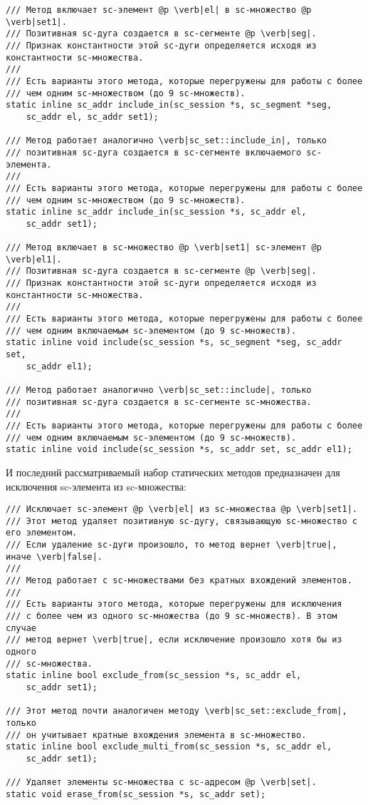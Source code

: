 \begin{lstlisting}[texcl]
/// Метод включает sc-элемент @p \verb|el| в sc-множество @p \verb|set1|.
/// Позитивная sc-дуга создается в sc-сегменте @p \verb|seg|.
/// Признак константности этой sc-дуги определяется исходя из константности sc-множества.
///
/// Есть варианты этого метода, которые перегружены для работы с более
/// чем одним sc-множеством (до 9 sc-множеств).
static inline sc_addr include_in(sc_session *s, sc_segment *seg,
    sc_addr el, sc_addr set1);

/// Метод работает аналогично \verb|sc_set::include_in|, только
/// позитивная sc-дуга создается в sc-сегменте включаемого sc-элемента.
///
/// Есть варианты этого метода, которые перегружены для работы с более
/// чем одним sc-множеством (до 9 sc-множеств).
static inline sc_addr include_in(sc_session *s, sc_addr el,
    sc_addr set1);

/// Метод включает в sc-множество @p \verb|set1| sc-элемент @p \verb|el1|.
/// Позитивная sc-дуга создается в sc-сегменте @p \verb|seg|.
/// Признак константности этой sc-дуги определяется исходя из константности sc-множества.
///
/// Есть варианты этого метода, которые перегружены для работы с более
/// чем одним включаемым sc-элементом (до 9 sc-множеств).
static inline void include(sc_session *s, sc_segment *seg, sc_addr set,
    sc_addr el1);

/// Метод работает аналогично \verb|sc_set::include|, только
/// позитивная sc-дуга создается в sc-сегменте sc-множества.
///
/// Есть варианты этого метода, которые перегружены для работы с более
/// чем одним включаемым sc-элементом (до 9 sc-множеств).
static inline void include(sc_session *s, sc_addr set, sc_addr el1);
\end{lstlisting}

И последний рассматриваемый набор статических методов предназначен для
исключения sc-элемента из sc-множества:

\begin{lstlisting}[texcl]
/// Исключает sc-элемент @p \verb|el| из sc-множества @p \verb|set1|.
/// Этот метод удаляет позитивную sc-дугу, связывающую sc-множество с его элементом.
/// Если удаление sc-дуги произошло, то метод вернет \verb|true|, иначе \verb|false|.
///
/// Метод работает с sc-множествами без кратных вхождений элементов.
///
/// Есть варианты этого метода, которые перегружены для исключения
/// с более чем из одного sc-множества (до 9 sc-множеств). В этом случае
/// метод вернет \verb|true|, если исключение произошло хотя бы из одного
/// sc-множества.
static inline bool exclude_from(sc_session *s, sc_addr el,
    sc_addr set1);

/// Этот метод почти аналогичен методу \verb|sc_set::exclude_from|, только
/// он учитывает кратные вхождения элемента в sc-множество.
static inline bool exclude_multi_from(sc_session *s, sc_addr el,
    sc_addr set1);

/// Удаляет элементы sc-множества с sc-адресом @p \verb|set|.
static void erase_from(sc_session *s, sc_addr set);
\end{lstlisting}

